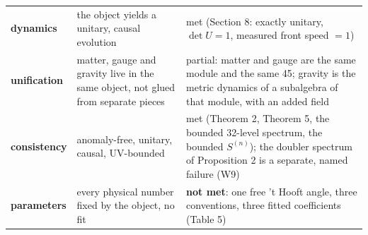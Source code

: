 \documentclass[aps,prd,amsmath,amssymb,superscriptaddress,longbibliography,floatfix,preprint]{revtex4-2}
\begin{document}
{\begin{longtable}{lll}
\arrayrulecolor{black!40}\hline\arrayrulecolor{black}
\parbox[c]{3.77cm}{\vspace{2.5pt}\raggedright {} \textbf{dynamics}\vspace{2.5pt}} & \parbox[c]{4.77cm}{\vspace{2.5pt}\raggedright {} the object yields a unitary, causal evolution\vspace{2.5pt}} & \parbox[c]{6.55cm}{\vspace{2.5pt}\raggedright {} met (Section 8: exactly unitary, \mbox{$\det U = 1$}, measured front speed \mbox{$= 1$})\vspace{2.5pt}} \\
\hline{}
\parbox[c]{3.77cm}{\vspace{2.5pt}\raggedright {} \textbf{unification}\vspace{2.5pt}} & \parbox[c]{4.77cm}{\vspace{2.5pt}\raggedright {} matter, gauge and gravity live in the same object, not glued from separate pieces\vspace{2.5pt}} & \parbox[c]{6.55cm}{\vspace{2.5pt}\raggedright {} partial: matter and gauge are the same module and the same 45; gravity is the metric dynamics of a subalgebra of that module, with an added field\vspace{2.5pt}} \\
\hline{}
\parbox[c]{3.77cm}{\vspace{2.5pt}\raggedright {} \textbf{consistency}\vspace{2.5pt}} & \parbox[c]{4.77cm}{\vspace{2.5pt}\raggedright {} anomaly-free, unitary, causal, UV-bounded\vspace{2.5pt}} & \parbox[c]{6.55cm}{\vspace{2.5pt}\raggedright {} met (Theorem 2, Theorem 5, the bounded 32-level spectrum, the bounded \mbox{$S^{(n)}$}); the doubler spectrum of Proposition 2 is a separate, named failure (W9)\vspace{2.5pt}} \\
\hline{}
\parbox[c]{3.77cm}{\vspace{2.5pt}\raggedright {} \textbf{parameters}\vspace{2.5pt}} & \parbox[c]{4.77cm}{\vspace{2.5pt}\raggedright {} every physical number fixed by the object, no fit\vspace{2.5pt}} & \parbox[c]{6.55cm}{\vspace{2.5pt}\raggedright {} \textbf{not met}: one free 't Hooft angle, three conventions, three fitted coefficients (Table 5)\vspace{2.5pt}} \\

\end{longtable}}
\end{document}
